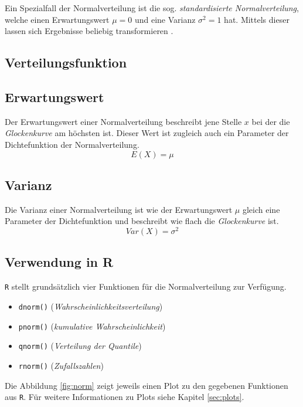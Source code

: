 Ein Spezialfall der Normalverteilung ist die sog.
\emph{standardisierte Normalverteilung}, welche einen 
Erwartungswert $\mu=0$ und eine Varianz $\sigma^2=1$ hat.
Mittels dieser lassen sich Ergebnisse beliebig transformieren
\parencite[298]{henze}.


\subsection{Verteilungsfunktion}

\subsection{Erwartungswert}
Der Erwartungswert einer Normalverteilung beschreibt jene
Stelle $x$ bei der die \emph{Glockenkurve} am höchsten ist.
Dieser Wert ist zugleich auch ein Parameter der Dichtefunktion
der Normalverteilung.
\[  
	E(X) = \mu
\]

\subsection{Varianz}
Die Varianz einer Normalverteilung ist wie der Erwartungswert
$\mu$ gleich eine Parameter der Dichtefunktion und beschreibt
wie flach die \emph{Glockenkurve} ist.
\[  
	Var(X) = \sigma^2
\]

\subsection{Verwendung in R}
\lstinline{R} stellt grundsätzlich vier Funktionen für die 
Normalverteilung zur Verfügung. 
\begin{itemize}
	\item \lstinline{dnorm()} \hfill{} 
		(\emph{Wahrscheinlichkeitsverteilung})
	\item \lstinline{pnorm()} \hfill{}
		(\emph{kumulative Wahrscheinlichkeit})
	\item \lstinline{qnorm()} \hfill{}
		(\emph{Verteilung der Quantile})
	\item \lstinline{rnorm()} \hfill{}
		(\emph{Zufallszahlen})
\end{itemize}
Die Abbildung \ref{fig:norm} zeigt jeweils einen Plot zu den gegebenen
Funktionen aus \lstinline{R}. Für weitere Informationen zu Plots siehe
Kapitel \ref{sec:plots}.





